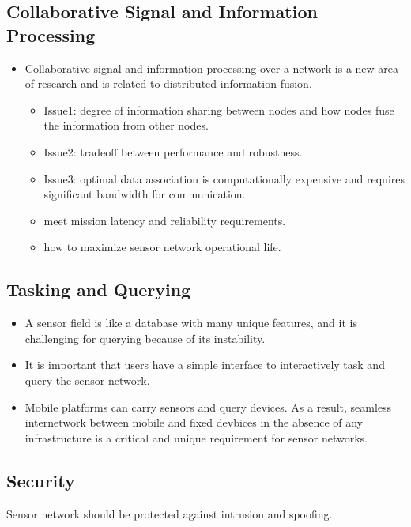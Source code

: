 \documentclass[letterpaper,10pt]{article}
\begin{document}
\subsection{Collaborative Signal and Information Processing}

\begin{itemize}
	\item Collaborative signal and information processing over a network is a new area of research and is related to distributed information fusion.
	\begin{itemize}
		\item Issue1: degree of information sharing between nodes and how nodes fuse the information from other nodes.
		\item Issue2: tradeoff between performance and robustness.
		\item Issue3: optimal data association is computationally expensive and requires significant bandwidth for communication.
		\item meet mission latency and reliability requirements.
		\item how to maximize sensor network operational life.
	\end{itemize}
\end{itemize}

\subsection{Tasking and Querying}

\begin{itemize}
	\item A sensor field is like a database with many unique features, and it is challenging for querying because of its instability.
	\item It is important that users have a simple interface to interactively task and query the sensor network.
	\item Mobile platforms can carry sensors and query devices. As a result, seamless internetwork between mobile and fixed devbices in the absence of any infrastructure is a critical and unique requirement for sensor networks.
\end{itemize}

\subsection{Security}

Sensor network should be protected against intrusion and spoofing.
\end{document}
